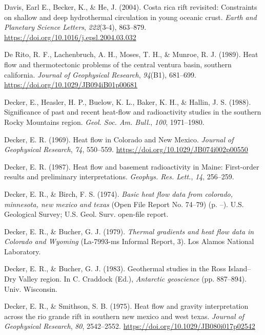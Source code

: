 \documentclass[draft,linenumbers]{agujournal2018}
\begin{document}
\leavevmode{}%
Davis, Earl E., Becker, K., \& He, J. (2004). Costa rica rift revisited:
Constraints on shallow and deep hydrothermal circulation in young
oceanic crust. \emph{Earth and Planetary Science Letters},
\emph{222}(3-4), 863--879.
\url{https://doi.org/10.1016/j.epsl.2004.03.032}

\leavevmode{}%
De Rito, R. F., Lachenbruch, A. H., Moses, T. H., \& Munroe, R. J.
(1989). Heat flow and thermotectonic problems of the central ventura
basin, southern california. \emph{Journal of Geophysical Research},
\emph{94}(B1), 681--699. \url{https://doi.org/10.1029/JB094iB01p00681}

\leavevmode{}%
Decker, E., Heasler, H. P., Buelow, K. L., Baker, K. H., \& Hallin, J.
S. (1988). Significance of past and recent heat-flow and radioactivity
studies in the southern {Rocky Mountains} region. \emph{Geol. Soc. Am.
Bull.}, \emph{100}, 1971--1980.

\leavevmode{}%
Decker, E. R. (1969). Heat flow in {Colorado and New Mexico}.
\emph{Journal of Geophysical Research}, \emph{74}, 550--559.
\url{https://doi.org/10.1029/JB074i002p00550}

\leavevmode{}%
Decker, E. R. (1987). Heat flow and basement radioactivity in {Maine}:
First-order results and preliminary interpretations. \emph{Geophys. Res.
Lett.}, \emph{14}, 256--259.

\leavevmode{}%
Decker, E. R., \& Birch, F. S. (1974). \emph{Basic heat flow data from
colorado, minnesota, new mexico and texas} (Open File Report No. 74--79)
(p. --). U.S. Geological Survey; U.S. Geol. Surv. open-file report.

\leavevmode{}%
Decker, E. R., \& Bucher, G. J. (1979). \emph{Thermal gradients and heat
flow data in {Colorado and Wyoming}} (La-7993-ms Informal Report, 3).
Los Alamos National Laboratory.

\leavevmode{}%
Decker, E. R., \& Bucher, G. J. (1983). Geothermal studies in the {Ross
Island--Dry Valley} region. In C. Craddock (Ed.), \emph{Antarctic
geoscience} (pp. 887--894). Univ. Wisconsin.

\leavevmode{}%
Decker, E. R., \& Smithson, S. B. (1975). Heat flow and gravity
interpretation across the rio grande rift in southern new mexico and
west texas. \emph{Journal of Geophysical Research}, \emph{80},
2542--2552. \url{https://doi.org/10.1029/JB080i017p02542}
\end{document}
